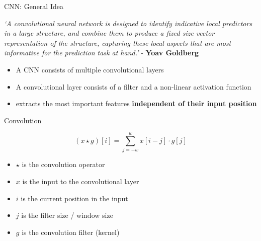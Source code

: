 \begin{frame}{CNN: General Idea}{}
	\begin{boxBlueNoFrame}
		\footnotesize
		\textit{`A convolutional neural network is designed to identify indicative local predictors in a large structure, and combine them to produce a fixed size vector
		representation of the structure, capturing these local aspects that are most informative for the prediction task at hand.'} - \textbf{Yoav Goldberg}
	\end{boxBlueNoFrame}
	\begin{itemize}
		\item A CNN consists of multiple convolutional layers
		\item A convolutional layer consists of a filter and a non-linear activation function
		\item {} extracts the most important features \textbf{independent of their input position}
	\end{itemize}
\end{frame}


\begin{frame}{Convolution}{}\important
	\begin{boxBlueNoFrame}
		\begin{equation*}
			(x \star g)[i] = \sum_{j=-w}^w x[i - j] \cdot g[j]
		\end{equation*}
	\end{boxBlueNoFrame}
		
	\begin{itemize}
		\item $\star$ is the convolution operator
		\item $x$ is the input to the convolutional layer
		\item $i$ is the current position in the input
		\item $j$ is the filter size / window size
		\item $g$ is the convolution filter (kernel)
	\end{itemize}
\end{frame}


